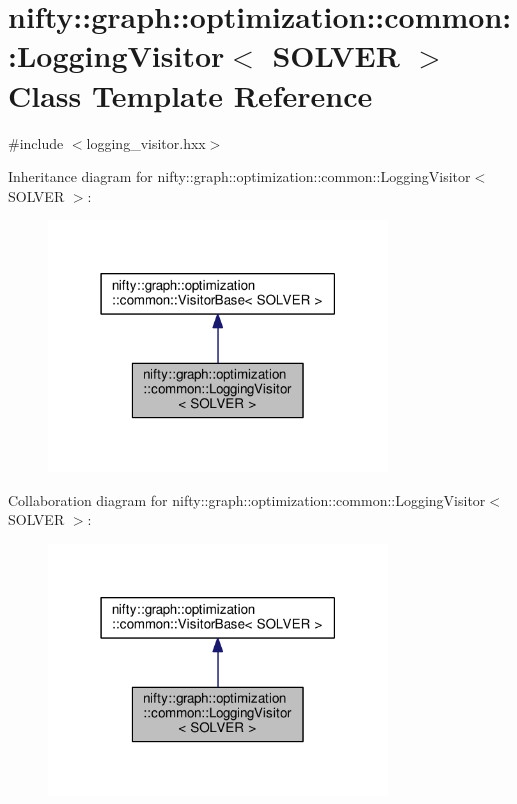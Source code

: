 \hypertarget{classnifty_1_1graph_1_1optimization_1_1common_1_1LoggingVisitor}{}\section{nifty\+:\+:graph\+:\+:optimization\+:\+:common\+:\+:Logging\+Visitor$<$ S\+O\+L\+V\+E\+R $>$ Class Template Reference}
\label{classnifty_1_1graph_1_1optimization_1_1common_1_1LoggingVisitor}


{\ttfamily \#include $<$logging\+\_\+visitor.\+hxx$>$}



Inheritance diagram for nifty\+:\+:graph\+:\+:optimization\+:\+:common\+:\+:Logging\+Visitor$<$ S\+O\+L\+V\+E\+R $>$\+:\nopagebreak
\begin{figure}[H]
\begin{center}
\leavevmode
\includegraphics[width=255pt]{classnifty_1_1graph_1_1optimization_1_1common_1_1LoggingVisitor__inherit__graph}
\end{center}
\end{figure}


Collaboration diagram for nifty\+:\+:graph\+:\+:optimization\+:\+:common\+:\+:Logging\+Visitor$<$ S\+O\+L\+V\+E\+R $>$\+:\nopagebreak
\begin{figure}[H]
\begin{center}
\leavevmode
\includegraphics[width=255pt]{classnifty_1_1graph_1_1optimization_1_1common_1_1LoggingVisitor__coll__graph}
\end{center}
\end{figure}
